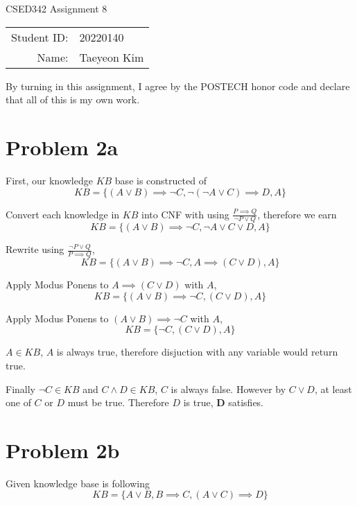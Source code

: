 \documentclass[12pt]{article}
\begin{document}
\begin{center}
{\Large CSED342 Assignment 8 \vspace{10pt}}

\begin{tabular}{rl}
Student ID: & 20220140 \\
Name: & Taeyeon Kim \\
\end{tabular}
\end{center}

\begin{center}
By turning in this assignment, I agree by the POSTECH honor code and declare that all of this is my own work.
\end{center}

\section*{Problem 2a}

First, our knowledge $KB$ base is constructed of
\[
KB = \{(A \lor B) \implies \lnot C, \lnot (\lnot A \lor C) \implies D, A \}
\]

Convert each knowledge in $KB$ into CNF with using $\frac{P \implies Q}{\lnot P \lor Q}$, therefore we earn
\[
KB = \{(A \lor B) \implies \lnot C, \lnot A \lor C \lor D, A \}
\]

Rewrite using $\frac{\lnot P \lor Q}{P \implies Q}$,
\[
KB = \{(A \lor B) \implies \lnot C, A \implies (C \lor D), A \}
\]

Apply Modus Ponens to $A \implies (C \lor D)$ with $A$,
\[
KB = \{(A \lor B) \implies \lnot C, (C \lor D), A \}
\]

Apply Modus Ponens to $(A \lor B) \implies \lnot C$ with $A$,
\[
KB = \{\lnot C, (C \lor D), A \}
\]

\because $A \in KB$, $A$ is always true, therefore disjuction with any variable would return true.


Finally $\lnot C \in KB$ and $C \land D \in KB$, $C$ is always false. However by $C \lor D$, at least one of $C$ or $D$ must be true.
Therefore $D$ is true, \textbf{D} satisfies.

\null\hfill\square


\section*{Problem 2b}


Given knowledge base is following
\[
KB = \{A \lor B, B \implies C, (A \lor C) \implies D \}
\]
\end{document}
